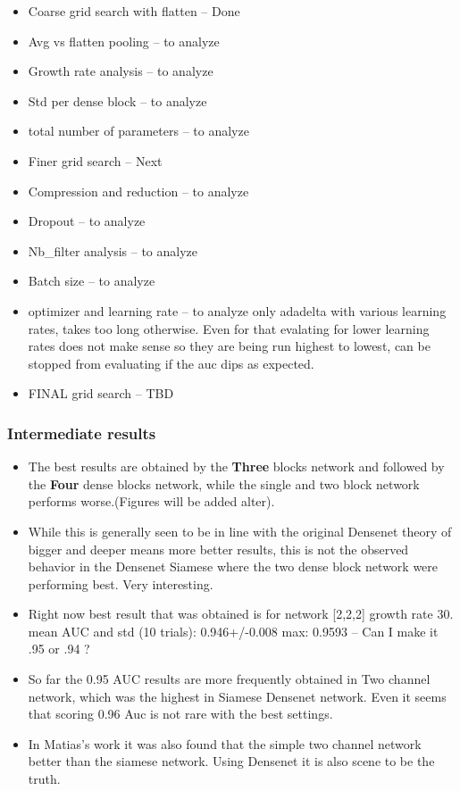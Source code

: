 \begin{itemize}
 \item Coarse grid search with flatten -- Done
 \item Avg vs flatten pooling -- to analyze
 \item Growth rate analysis -- to analyze
 \item Std per dense block -- to analyze
 \item total number of parameters -- to analyze
 \item Finer grid search -- Next
 \item Compression and reduction -- to analyze
 \item Dropout -- to analyze
 \item Nb\_filter analysis -- to analyze
 \item Batch size -- to analyze
 \item optimizer and learning rate -- to analyze only adadelta with various learning rates, takes too long otherwise. Even for that evalating for lower learning rates does not make sense so they are being run highest to lowest, 
 can be stopped from evaluating if the auc dips as expected.
 \item FINAL grid search -- TBD
\end{itemize}

\subsubsection{Intermediate results}
\begin{itemize}
 \item The best results are obtained by the \textbf{Three} blocks network and followed by the \textbf{Four} dense blocks network, while the single and two block network performs worse.(Figures will be added alter). 
 \item While this is generally seen to be in line with the original Densenet theory of bigger and deeper means more better results, this is not the observed behavior in the Densenet Siamese where the two dense block network 
 were performing best. Very interesting.
  \item Right now best result that was obtained is for network [2,2,2] growth rate 30. mean AUC and std (10 trials):  0.946+/-0.008  max:   0.9593 -- Can I make it .95 or .94 ?
  \item So far the 0.95 AUC results are more frequently obtained in Two channel network, which was the highest in Siamese Densenet network. Even it seems that scoring 0.96 Auc is not rare with the best settings.
 \item In Matias's work it was also found that the simple two channel network better than the siamese network. Using Densenet it is also scene to be the truth.
\end{itemize}

